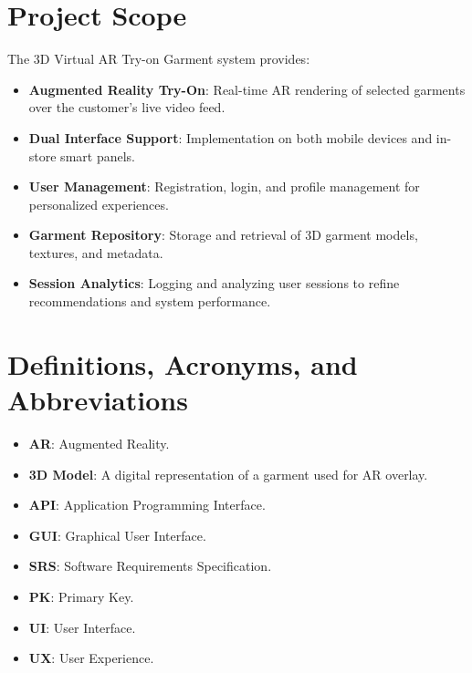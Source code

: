 \documentclass{scrreprt}
\begin{document}
\section{Project Scope}
The 3D Virtual AR Try-on Garment system provides:
\begin{itemize}
    \item \textbf{Augmented Reality Try-On}: Real-time AR rendering of selected garments over the customer’s live video feed.

    \item \textbf{Dual Interface Support}: Implementation on both mobile devices and in-store smart panels.

    \item \textbf{User Management}: Registration, login, and profile management for personalized experiences.

    \item \textbf{Garment Repository}: Storage and retrieval of 3D garment models, textures, and metadata.

    \item \textbf{Session Analytics}: Logging and analyzing user sessions to refine recommendations and system performance.
\end{itemize}

\section{Definitions, Acronyms, and Abbreviations}
\begin{itemize}
    \item \textbf{AR}: Augmented Reality.

    \item \textbf{3D Model}: A digital representation of a garment used for AR overlay.

    \item \textbf{API}: Application Programming Interface.

\item \textbf{GUI}: Graphical User Interface.

\item \textbf{SRS}: Software Requirements Specification.

\item \textbf{PK}: Primary Key.

\item \textbf{UI}: User Interface.

\item \textbf{UX}: User Experience.
\end{itemize}
\end{document}
